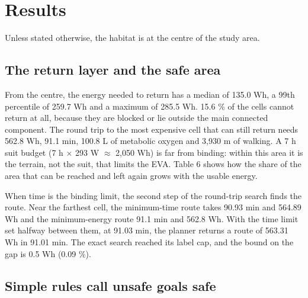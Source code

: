 \documentclass[11pt,a4paper]{article}
\begin{document}
\section{Results}

Unless stated otherwise, the habitat is at the centre of the study area.

\subsection{The return layer and the safe area}

From the centre, the energy needed to return has a median of 135.0 Wh, a 99th percentile of 259.7 Wh and a maximum of 285.5 Wh. 15.6 \% of the cells cannot return at all, because they are blocked or lie outside the main connected component. The round trip to the most expensive cell that can still return needs 562.8 Wh, 91.1 min, 100.8 L of metabolic oxygen and 3,930 m of walking. A 7 h suit budget (7 h $\times$ 293 W $\approx$ 2,050 Wh) is far from binding: within this area it is the terrain, not the suit, that limits the EVA. Table 6 shows how the share of the area that can be reached and left again grows with the usable energy.

\begin{table}[H]
\centering\small
\caption{Share of the grid that is reachable and returnable against the usable energy.}
\end{table}

When time is the binding limit, the second step of the round-trip search finds the route. Near the farthest cell, the minimum-time route takes 90.93 min and 564.89 Wh and the minimum-energy route 91.1 min and 562.8 Wh. With the time limit set halfway between them, at 91.03 min, the planner returns a route of 563.31 Wh in 91.01 min. The exact search reached its label cap, and the bound on the gap is 0.5 Wh (0.09 \%).

\subsection{Simple rules call unsafe goals safe}
\end{document}
